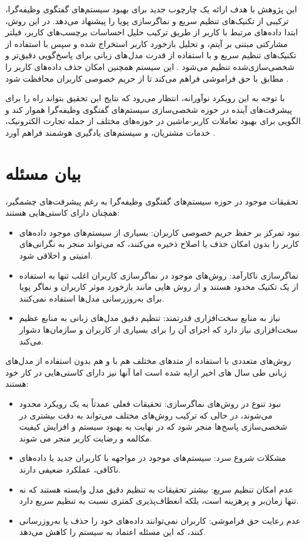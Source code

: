 این پژوهش با هدف ارائه یک چارچوب جدید برای بهبود سیستم‌های گفتگوی وظیفه‌گرا، ترکیبی از تکنیک‌های تنظیم سریع و نماگر‌سازی پویا را پیشنهاد می‌دهد. در این روش، ابتدا داده‌های مرتبط با کاربر از طریق ترکیب حلیل احساسات برچسب‌های کاربر، فیلتر مشارکتی مبتنی بر آیتم، و تحلیل بازخورد کاربر استخراج شده و سپس با استفاده از تکنیک‌های تنظیم سریع و با استفاده از قدرت مدل های زبانی برای پاسخ‌گویی دقیق‌تر و شخصی‌سازی‌شده تنظیم می‌شود 
\cite{elahi2023hybrid}. 
این سیستم همچنین امکان حذف داده‌های کاربر را مطابق با حق فراموشی فراهم می‌کند تا از حریم خصوصی کاربران محافظت شود 
\cite{zhang2024right}.

با توجه به این رویکرد نوآورانه، انتظار می‌رود که نتایج این تحقیق بتواند راه را برای پیشرفت‌های آینده در حوزه شخصی‌سازی سیستم‌های گفتگوی وظیفه‌گرا هموار کند و الگویی برای بهبود تعاملات کاربر-ماشین در حوزه‌های مختلف از جمله تجارت الکترونیک، خدمات مشتریان، و سیستم‌های یادگیری هوشمند فراهم آورد 
\cite{chen2023zero}.

\section{بیان مسئله}
تحقیقات موجود در حوزه سیستم‌های گفتگوی وظیفه‌گرا به رغم پیشرفت‌های چشمگیر، همچنان دارای کاستی‌هایی هستند:
\begin{itemize}
\item
نبود تمرکز بر حفظ حریم خصوصی کاربران: بسیاری از سیستم‌های موجود داده‌های کاربر را بدون امکان حذف یا اصلاح ذخیره می‌کنند، که می‌تواند منجر به نگرانی‌های امنیتی و اخلاقی شود.
\item
نماگر‌سازی ناکارآمد: روش‌های موجود در نماگر‌سازی کاربران اغلب تنها به استفاده از یک تکنیک محدود هستند و از روش هایی مانند بازخورد موثر کاربران و نماگر پویا برای به‌روزرسانی مدل‌ها استفاده نمی‌کنند.
\item
نیاز به منابع سخت‌افزاری قدرتمند: تنظیم دقیق مدل‌های زبانی به منابع عظیم سخت‌افزاری نیاز دارد که اجرای آن را برای بسیاری از کاربران و سازمان‌ها دشوار می‌کند.
\end{itemize}

روش‌های متعددی با استفاده از متدهای مختلف هم با و هم بدون استفاده از مدل‌های زبانی طی سال ‌های اخیر ارایه شده است اما آنها نیز دارای کاستی‌هایی در کار خود هستند:
\begin{itemize}
\item
نبود تنوع در روش‌های نماگر‌سازی: تحقیقات فعلی عمدتاً به یک رویکرد محدود می‌شوند، در حالی که ترکیب روش‌های مختلف می‌تواند به دقت بیشتری در شخصی‌سازی پاسخ‌ها منجر شود که در نهایت به بهبود سیستم و افزایش کیفیت مکالمه و رضایت کاربر منجر می شوند.
\item
مشکلات شروع سرد: سیستم‌های موجود در مواجهه با کاربران جدید یا داده‌های ناکافی، عملکرد ضعیفی دارند.
\item
عدم امکان تنظیم سریع: بیشتر تحقیقات به تنظیم دقیق مدل وابسته هستند که نه تنها زمان‌بر و پرهزینه است، بلکه انعطاف‌پذیری کمتری نسبت به تنظیم سریع دارد.
\item
عدم رعایت حق فراموشی: کاربران نمی‌توانند داده‌های خود را حذف یا به‌روزرسانی کنند، که این مسئله اعتماد به سیستم را کاهش می‌دهد.
\end{itemize}


